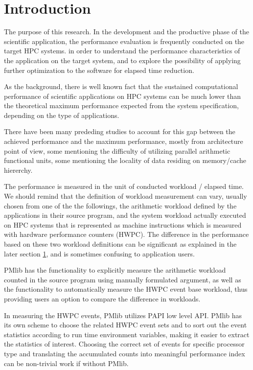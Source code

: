 \documentclass[conference]{IEEEtran}
\begin{document}
\section{Introduction}

The purpose of this research.
In the development and the productive phase of the scientific application,
the performance evaluation is frequently conducted on the target HPC systems.
in order to understand the performance characteristics
of the application on the target system, and to explore the possibility of
applying further optimization to the software for elapsed time reduction.

As the background, there is well known fact that 
the sustained computational performance of scientific applications on HPC
systems can be much lower than the theoretical maximum performance
expected from the system specification, depending on the type of applications.

\cite{cite-1-1}

There have been many prededing studies to account for this gap between
the achieved performance and the maximum performance, mostly from architecture
point of view,
some mentioning the difficulty of utilizing parallel arithmetic functional units,
some mentioning the locality of data residing on memory/cache hiererchy.

\cite{paper-bottleneck-analysis}

The performance is measured in the unit of conducted workload / elapsed time.
We should remind that the definition of workload measurement can vary,
usually chosen from one of the the followings,
the arithmetic workload defined by the applications in their source program,
and the system workload actually executed on HPC systems that is represented as
machine instructions which is measured with hardware performance counters (HWPC).
The difference in the performance based on these two workload definitions
can be significant as explained in the later section \ref{},
and is sometimes confusing to application users.


PMlib has the functionality
to explicitly measure the arithmetic workload counted in the source program
using manually formulated argument, as well as the functionality
to automatically measure the HWPC event base workload,
thus providing users an option to compare the difference in workloads.

In measuring the HWPC events, PMlib utilizes PAPI \cite{} low level API.
PMlib has its own scheme to choose the related HWPC event sets and to sort out
the event statistics according to run time environment variables, making it
easier to extract the statistics of interest.
Choosing the correct set of events for specific processor type and
translating the accumulated counts into meaningful performance index can be
non-trivial work if without PMlib.
\end{document}
